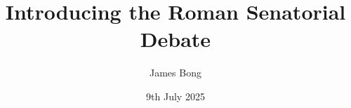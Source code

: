 \documentclass[9pt]{article}
\title{Introducing the Roman Senatorial Debate}
\author{James Bong}
\date{9th July 2025}
\begin{document}
\sloppy


\maketitle










\end{document}
